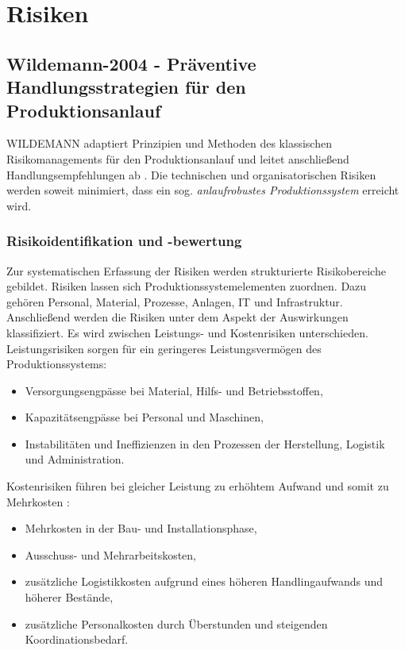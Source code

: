 \section{Risiken}

\subsection*{Wildemann-2004 - Präventive Handlungsstrategien für den Produktionsanlauf}

WILDEMANN adaptiert Prinzipien und Methoden des klassischen Risikomanagements für den Produktionsanlauf und leitet anschließend Handlungsempfehlungen ab \autocite{Wildemann2004}. Die technischen und organisatorischen Risiken werden soweit minimiert, dass ein sog. \textit{anlaufrobustes Produktionssystem} erreicht wird. 


\subsubsection*{Risikoidentifikation und -bewertung}
Zur systematischen Erfassung der Risiken werden strukturierte Risikobereiche gebildet. 
Risiken lassen sich Produktionssystemelementen zuordnen. Dazu gehören Personal, Material, Prozesse, Anlagen, IT und Infrastruktur. Anschließend werden die Risiken unter dem Aspekt der Auswirkungen klassifiziert. Es wird zwischen Leistungs- und Kostenrisiken unterschieden. Leistungsrisiken sorgen für ein geringeres Leistungsvermögen des Produktionssystems:
\begin{itemize}
 \item Versorgungsengpässe bei Material,
Hilfs- und Betriebsstoffen,
\item Kapazitätsengpässe bei Personal und
Maschinen,
\item Instabilitäten und Ineffizienzen in
den Prozessen der Herstellung,
Logistik und Administration.
\end{itemize}
Kostenrisiken führen bei gleicher Leistung zu erhöhtem Aufwand und somit zu Mehrkosten \autocite{Wiendahl2002}: 
\begin{itemize}
 \item Mehrkosten in der Bau- und Installationsphase,
\item Ausschuss- und Mehrarbeitskosten,
\item zusätzliche Logistikkosten aufgrund
eines höheren Handlingaufwands
und höherer Bestände,
\item zusätzliche Personalkosten durch
Überstunden und steigenden Koordinationsbedarf.
\end{itemize}


